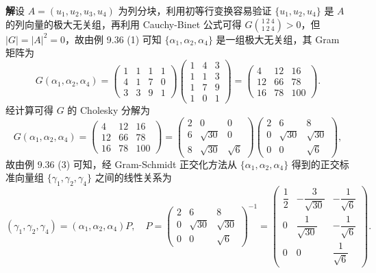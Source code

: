 \documentclass[UTF8,12pt,a4paper,fontset=fandol]{ctexart}
\begin{document}
\noindent\textbf{解}\quad 设 $A=(u_1,u_2,u_3,u_4)$ 为列分块，利用初等行变换容易验证 $\{u_1,u_2,u_4\}$ 是 $A$ 的列向量的极大无关组，再利用 Cauchy-Binet 公式可得 $G\binom{1\ 2\ 4}{1\ 2\ 4}>0$，但 $|G|=|A|^2=0$，故由例 9.36 (1) 可知 $\{\alpha_1,\alpha_2,\alpha_4\}$ 是一组极大无关组，其 Gram 矩阵为
\[
G(\alpha_1,\alpha_2,\alpha_4)=
\begin{pmatrix}
1&1&1&1\\
4&1&7&0\\
3&3&9&1
\end{pmatrix}
\begin{pmatrix}
1&4&3\\
1&1&3\\
1&7&9\\
1&0&1
\end{pmatrix}
=
\begin{pmatrix}
4&12&16\\
12&66&78\\
16&78&100
\end{pmatrix}.
\]
经计算可得 $G$ 的 Cholesky 分解为
\[
G(\alpha_1,\alpha_2,\alpha_4)=
\begin{pmatrix}
4&12&16\\
12&66&78\\
16&78&100
\end{pmatrix}
=
\begin{pmatrix}
2&0&0\\
6&\sqrt{30}&0\\
8&\sqrt{30}&\sqrt6
\end{pmatrix}
\begin{pmatrix}
2&6&8\\
0&\sqrt{30}&\sqrt{30}\\
0&0&\sqrt6
\end{pmatrix},
\]
故由例 9.36 (3) 可知，经 Gram-Schmidt 正交化方法从 $\{\alpha_1,\alpha_2,\alpha_4\}$ 得到的正交标准向量组 $\{\gamma_1,\gamma_2,\gamma_4\}$ 之间的线性关系为
\[
(\gamma_1,\gamma_2,\gamma_4)=(\alpha_1,\alpha_2,\alpha_4)P,\quad
P=
\begin{pmatrix}
2&6&8\\
0&\sqrt{30}&\sqrt{30}\\
0&0&\sqrt6
\end{pmatrix}^{-1}
=
\begin{pmatrix}
\dfrac12&-\dfrac3{\sqrt{30}}&-\dfrac1{\sqrt6}\\
0&\dfrac1{\sqrt{30}}&-\dfrac1{\sqrt6}\\
0&0&\dfrac1{\sqrt6}
\end{pmatrix}.
\]
\end{document}
